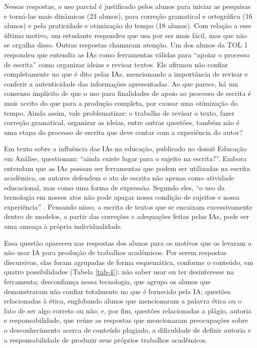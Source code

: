 \documentclass[portuguese]{textolivre}
\begin{document}
Nessas respostas, o uso parcial é justificado pelos alunos para iniciar as pesquisas e torná-las mais dinâmicas (23 alunos), para correção gramatical e ortográfica (16 alunos) e pela praticidade e otimização do tempo (18 alunos). Com relação a esse último motivo, um estudante respondeu que usa por ser mais fácil, mas que não se orgulha disso. Outras respostas chamaram atenção. Um dos alunos da TOL 1 respondeu que entendia as IAs como ferramentas válidas para ``apoiar o processo de escrita'' como organizar ideias e revisar textos. Ele afirmou não confiar completamente no que é dito pelas IAs, mencionando a importância de revisar e conferir a autenticidade das informações apresentadas. Ao que parece, há um consenso implícito de que o uso para finalidades de apoio ao processo de escrita é mais aceito do que para a produção completa, por causar uma otimização do tempo. Ainda assim, vale problematizar: o trabalho de revisar o texto, fazer correção gramatical, organizar as ideias, entre outras questões, também não é uma etapa do processo de escrita que deve contar com a experiência do autor?

Em texto sobre a influência das IAs na educação, publicado no dossiê Educação em Análise, \textcite{pimenta2024} questionam: ``ainda existe lugar para o sujeito na escrita?''. Embora entendam que as IAs possam ser ferramentas que podem ser utilizadas na escrita acadêmica, os autores defendem o ato de escrita não apenas como atividade educacional, mas como uma forma de expressão. Segundo eles, ``o uso da tecnologia em nossos atos não pode apagar nossa condição de sujeitos e nossa experiência'' \citeyear[p. 606]{pimenta2024}. Pensando nisso, a escrita de textos que se encaixam excessivamente dentro de modelos, a partir das correções e adequações feitas pelas IAs, pode ser uma ameaça à própria individualidade.

Essa questão apareceu nas respostas dos alunos para os motivos que os levaram a não usar IA para produção de trabalhos acadêmicos. Por serem respostas discursivas, elas foram agrupadas de forma esquemática, conforme o conteúdo, em quatro possibilidades (Tabela \ref{tab-4}): não saber usar ou ter desinteresse na ferramenta; desconfiança nessa tecnologia, que agrupa os alunos que demonstraram não confiar totalmente no que é fornecido pela IA; questões relacionadas à ética, englobando alunos que mencionaram a palavra ética ou o fato de ser algo correto ou não; e, por fim, questões relacionadas a plágio, autoria e responsabilidade, que reúne as respostas que mencionaram preocupações sobre o desconhecimento acerca de conteúdo plagiado, a dificuldade de definir autoria e a responsabilidade de produzir seus próprios trabalhos acadêmicos.
\end{document}
